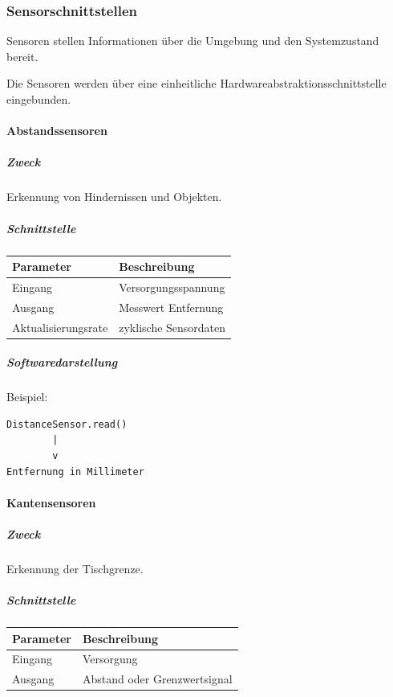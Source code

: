 \documentclass[
  a4paper,
  12pt,
  DIV=12,        %
  parskip=half,  %
  headings=small %
]{scrartcl}
\theoremstyle{definition}
\theoremstyle{definition}
\begin{document}
\subsubsection{Sensorschnittstellen}\label{sensorschnittstellen}

Sensoren stellen Informationen über die Umgebung und den Systemzustand
bereit.

Die Sensoren werden über eine einheitliche
Hardwareabstraktionsschnittstelle eingebunden.

\paragraph{Abstandssensoren}\label{abstandssensoren-1}

\subparagraph{Zweck}\label{zweck}

Erkennung von Hindernissen und Objekten.

\subparagraph{Schnittstelle}\label{schnittstelle}

\begin{longtable}[]{@{}ll@{}}
\toprule\noalign{}
Parameter & Beschreibung \\
\midrule\noalign{}
\endhead
\bottomrule\noalign{}
\endlastfoot
Eingang & Versorgungsspannung \\
Ausgang & Messwert Entfernung \\
Aktualisierungsrate & zyklische Sensordaten \\
\end{longtable}

\subparagraph{Softwaredarstellung}\label{softwaredarstellung}

Beispiel:

\begin{verbatim}
DistanceSensor.read()
        |
        v
Entfernung in Millimeter
\end{verbatim}

\paragraph{Kantensensoren}\label{kantensensoren}

\subparagraph{Zweck}\label{zweck-1}

Erkennung der Tischgrenze.

\subparagraph{Schnittstelle}\label{schnittstelle-1}

\begin{longtable}[]{@{}ll@{}}
\toprule\noalign{}
Parameter & Beschreibung \\
\midrule\noalign{}
\endhead
\bottomrule\noalign{}
\endlastfoot
Eingang & Versorgung \\
Ausgang & Abstand oder Grenzwertsignal \\
\end{longtable}
\end{document}
